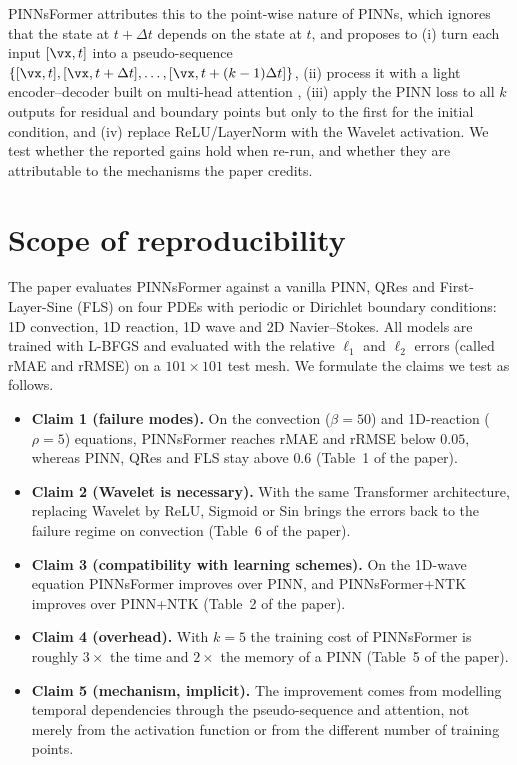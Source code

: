 \documentclass[10pt]{article} %
\begin{document}
PINNsFormer \citep{zhao2024pinnsformer} attributes this to the point-wise nature of PINNs, which ignores that the state at $t+\Delta t$ depends on the state at $t$, and proposes to (i) turn each input $[\vx,t]$ into a pseudo-sequence $\{[\vx,t],[\vx,t+\Delta t],\dots,[\vx,t+(k-1)\Delta t]\}$, (ii) process it with a light encoder--decoder built on multi-head attention \citep{vaswani2017attention}, (iii) apply the PINN loss to all $k$ outputs for residual and boundary points but only to the first for the initial condition, and (iv) replace ReLU/LayerNorm with the Wavelet activation. We test whether the reported gains hold when re-run, and whether they are attributable to the mechanisms the paper credits.

\section{Scope of reproducibility}
\label{sec:claims}

The paper evaluates PINNsFormer against a vanilla PINN, QRes \citep{bu2021qres} and First-Layer-Sine (FLS) \citep{wong2022fls} on four PDEs with periodic or Dirichlet boundary conditions: 1D convection, 1D reaction, 1D wave and 2D Navier--Stokes. All models are trained with L-BFGS \citep{liu1989lbfgs} and evaluated with the relative $\ell_1$ and $\ell_2$ errors (called rMAE and rRMSE) on a $101\times101$ test mesh. We formulate the claims we test as follows.

\begin{itemize}
    \item \textbf{Claim 1 (failure modes).} On the convection ($\beta=50$) and 1D-reaction ($\rho=5$) equations, PINNsFormer reaches rMAE and rRMSE below $0.05$, whereas PINN, QRes and FLS stay above $0.6$ (Table~1 of the paper).
    \item \textbf{Claim 2 (Wavelet is necessary).} With the same Transformer architecture, replacing Wavelet by ReLU, Sigmoid or Sin brings the errors back to the failure regime on convection (Table~6 of the paper).
    \item \textbf{Claim 3 (compatibility with learning schemes).} On the 1D-wave equation PINNsFormer improves over PINN, and PINNsFormer+NTK improves over PINN+NTK (Table~2 of the paper).
    \item \textbf{Claim 4 (overhead).} With $k=5$ the training cost of PINNsFormer is roughly $3\times$ the time and $2\times$ the memory of a PINN (Table~5 of the paper).
    \item \textbf{Claim 5 (mechanism, implicit).} The improvement comes from modelling temporal dependencies through the pseudo-sequence and attention, not merely from the activation function or from the different number of training points.
\end{itemize}
\end{document}
